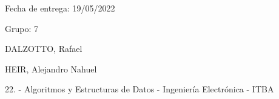 
\begin{DoxyItemize}
\item Fecha de entrega\+: 19/05/2022
\item Grupo\+: 7
\begin{DoxyItemize}
\item DALZOTTO, Rafael
\item HEIR, Alejandro Nahuel
\end{DoxyItemize}
\end{DoxyItemize}

22. -\/ Algoritmos y Estructuras de Datos -\/ Ingeniería Electrónica -\/ ITBA 